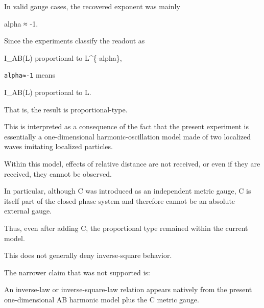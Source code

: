 \documentclass[
]{article}
\newenvironment{Shaded}{}{}
\newcommand{\NormalTok}[1]{#1}
\begin{document}
In valid gauge cases, the recovered exponent was mainly

\begin{Shaded}
\begin{Highlighting}[]
\NormalTok{alpha ≈ {-}1.}
\end{Highlighting}
\end{Shaded}

Since the experiments classify the readout as

\begin{Shaded}
\begin{Highlighting}[]
\NormalTok{I\_AB(L) proportional to L\^{}\{{-}alpha\},}
\end{Highlighting}
\end{Shaded}

\texttt{alpha≈-1} means

\begin{Shaded}
\begin{Highlighting}[]
\NormalTok{I\_AB(L) proportional to L.}
\end{Highlighting}
\end{Shaded}

That is, the result is proportional-type.

This is interpreted as a consequence of the fact that the present
experiment is essentially a one-dimensional harmonic-oscillation model
made of two localized waves imitating localized particles.

Within this model, effects of relative distance are not received, or
even if they are received, they cannot be observed.

In particular, although C was introduced as an independent metric gauge,
C is itself part of the closed phase system and therefore cannot be an
absolute external gauge.

Thus, even after adding C, the proportional type remained within the
current model.

This does not generally deny inverse-square behavior.

The narrower claim that was not supported is:

\begin{Shaded}
\begin{Highlighting}[]
\NormalTok{An inverse{-}law or inverse{-}square{-}law relation appears natively}
\NormalTok{from the present one{-}dimensional AB harmonic model plus the C metric gauge.}
\end{Highlighting}
\end{Shaded}
\end{document}
